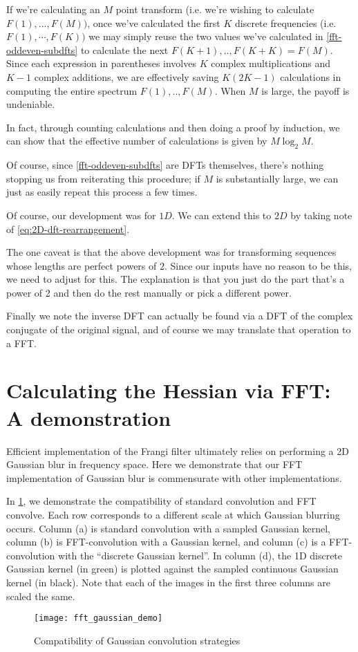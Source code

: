 If we're calculating an $M$ point transform
(i.e. we're wishing to
calculate $F(1), ... , F(M))$, once we've calculated the first $K$ discrete frequencies (i.e. $F(1), \cdots , F(K))$ we may simply reuse the two values we've calculated in \cref{fft-oddeven-subdfts} to calculate the next $F(K+1),..,F(K+K) = F(M)$. Since each expression in parentheses involves $K$ complex multiplications and $K-1$ complex additions, we are effectively saving $K(2K-1)$ calculations in computing the entire spectrum  $F(1), ..,  F(M)$. When $M$ is large, the payoff is undeniable.

In fact, through counting calculations and then doing a proof by induction, we can show that the effective number of calculations is given by $M\log_2{M}$. %

Of course, since \cref{fft-oddeven-subdfts} are DFTs themselves, there's nothing stopping us from reiterating this procedure; if $M$ is substantially large, we can just as easily repeat this process a few times.

Of course, our development was for $1D$.  We can extend this to $2D$ by taking note of \cref{eq:2D-dft-rearrangement}.

The one caveat is that the above development was for transforming sequences whose lengths are perfect powers of $2$. Since our inputs have no reason to be this, we need to adjust for this. The explanation is that you just do the part that's a power of 2 and  then do the rest manually or pick a different power.

Finally we note the inverse DFT can actually be found via a DFT of the complex conjugate of the original signal, and of course we may translate that operation to a FFT. %

\section{Calculating the Hessian via FFT: A demonstration}

Efficient implementation of the Frangi filter ultimately relies on performing a 2D Gaussian blur in frequency space. Here we demonstrate that our FFT implementation of Gaussian blur is commensurate with other implementations. 

In \cref{fig:fft-gaussian-demo}, we demonstrate the compatibility of standard convolution and FFT convolve. Each row corresponds to a different scale at which Gaussian blurring  occurs. Column (a) is standard convolution with a sampled Gaussian kernel, column (b) is FFT-convolution with a Gaussian kernel, and column (c) is a FFT-convolution with the ``discrete Gaussian kernel''. In column (d), the 1D discrete Gaussian kernel (in green) is plotted against the sampled continuous Gaussian kernel (in black). Note that each of the images in the first three columns are scaled the same.
\begin{figure}
  \texttt{[image: fft\_gaussian\_demo]}
  \caption{Compatibility of Gaussian convolution strategies}
  \label{fig:fft-gaussian-demo}
\end{figure}

